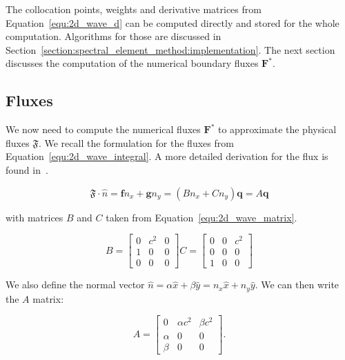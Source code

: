 The collocation points, weights and derivative matrices from Equation~\ref{equ:2d_wave_d} can be
computed directly and stored for the whole computation. Algorithms for those are discussed in
Section~\ref{section:spectral_element_method:implementation}. The next section discusses the
computation of the numerical boundary fluxes \(\mathbf{F}^*\).

\subsection{Fluxes}\label{subsection:spectral_element_method:dg_sem:fluxes}

We now need to compute the numerical fluxes \(\mathbf{F}^*\) to approximate the physical fluxes
\(\mathfrak{F}\). We recall the formulation for the fluxes from Equation~\ref{equ:2d_wave_integral}.
A more detailed derivation for the flux is found in~\cite{Kopriva2009}.

\begin{equation} \label{equ:physical_fluxes}
    \mathfrak{F} \cdot \widehat{n} = \mathbf{f} n_x + \mathbf{g} n_y = (B n_x + C n_y) \mathbf{q} = A \mathbf{q}
\end{equation}

\noindent
with matrices \(B\) and \(C\) taken from Equation~\ref{equ:2d_wave_matrix}.

\begin{equation}
    B = \begin{bmatrix}
        0 & c^2 & 0 \\ 
        1 & 0 & 0 \\ 
        0 & 0 & 0 
    \end{bmatrix}
    C = \begin{bmatrix}
        0 & 0 & c^2\\ 
        0 & 0 & 0 \\ 
        1 & 0 & 0
    \end{bmatrix}
\end{equation}

We also define the normal vector \(\widehat{n} = \alpha \widehat{x} + \beta \widehat{y} = n_x
\widehat{x} + n_y \widehat{y}\). We can then write the \(A\) matrix:

\begin{equation}
    A = \begin{bmatrix}
        0 & \alpha c^2 & \beta c^2 \\ 
        \alpha & 0 & 0 \\ 
        \beta & 0 & 0 
    \end{bmatrix}.
\end{equation}

